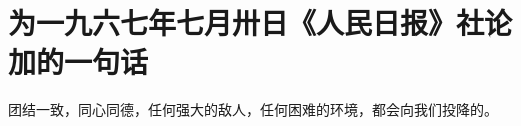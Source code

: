 \section[为一九六七年七月卅日《人民日报》社论加的一句话（一九六七年七月）]{为一九六七年七月卅日《人民日报》社论加的一句话}


团结一致，同心同德，任何强大的敌人，任何困难的环境，都会向我们投降的。

